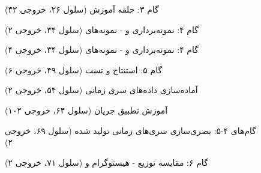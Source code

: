 \begin{figure}[H]
    \centering
    \caption{گام ۳: حلقه آموزش  (سلول ۲۶، خروجی ۴۲)}
\end{figure}

\begin{figure}[H]
    \centering
    \caption{گام ۴: نمونه‌برداری  و  - نمونه‌های  (سلول ۳۴، خروجی ۲)}
\end{figure}

\begin{figure}[H]
    \centering
    \caption{گام ۴: نمونه‌برداری  و  - نمونه‌های  (سلول ۳۴، خروجی ۴)}
\end{figure}

\begin{figure}[H]
    \centering
    \caption{گام ۵: استنتاج و تست (سلول ۴۹، خروجی ۶)}
\end{figure}

\begin{figure}[H]
    \centering
    \caption{آماده‌سازی داده‌های سری زمانی (سلول ۵۴، خروجی ۲)}
\end{figure}

\begin{figure}[H]
    \centering
    \caption{آموزش تطبیق جریان (سلول ۶۴، خروجی ۱۰۲)}
\end{figure}

\begin{figure}[H]
    \centering
    \caption{گام‌های ۴-۵: بصری‌سازی سری‌های زمانی تولید شده (سلول ۶۹، خروجی ۲)}
\end{figure}

\begin{figure}[H]
    \centering
    \caption{گام ۶: مقایسه توزیع - هیستوگرام و  (سلول ۷۱، خروجی ۲)}
\end{figure}



